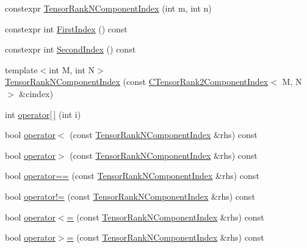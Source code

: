 \begin{DoxyCompactItemize}
\item 
constexpr \mbox{\hyperlink{classmpc_1_1core_1_1_tensor_rank_n_component_index_3_012_01_4_aea9ecace40b5b929c8aea1eadcbf61a4}{Tensor\+Rank\+N\+Component\+Index}} (int m, int n)
\item 
constexpr int \mbox{\hyperlink{classmpc_1_1core_1_1_tensor_rank_n_component_index_3_012_01_4_afe7292937d5a92d4f5fb95f71eed9187}{First\+Index}} () const
\item 
constexpr int \mbox{\hyperlink{classmpc_1_1core_1_1_tensor_rank_n_component_index_3_012_01_4_a592f40b07ac41675f94cbd986de89914}{Second\+Index}} () const
\item 
{\footnotesize template$<$int M, int N$>$ }\\\mbox{\hyperlink{classmpc_1_1core_1_1_tensor_rank_n_component_index_3_012_01_4_ab5582e74c69cfe2c25915fba547613c8}{Tensor\+Rank\+N\+Component\+Index}} (const \mbox{\hyperlink{classmpc_1_1core_1_1_c_tensor_rank2_component_index}{C\+Tensor\+Rank2\+Component\+Index}}$<$ M, N $>$ \&cindex)
\item 
int \mbox{\hyperlink{classmpc_1_1core_1_1_tensor_rank_n_component_index_3_012_01_4_a760e713bc39d78243bb8979aabe0c245}{operator\mbox{[}$\,$\mbox{]}}} (int i)
\item 
bool \mbox{\hyperlink{classmpc_1_1core_1_1_tensor_rank_n_component_index_3_012_01_4_affa9968262b55f95c8008607b279935a}{operator$<$}} (const \mbox{\hyperlink{classmpc_1_1core_1_1_tensor_rank_n_component_index}{Tensor\+Rank\+N\+Component\+Index}} \&rhs) const
\item 
bool \mbox{\hyperlink{classmpc_1_1core_1_1_tensor_rank_n_component_index_3_012_01_4_a7fd0591ac06ae0ffc5b9fe7050bfe8f0}{operator$>$}} (const \mbox{\hyperlink{classmpc_1_1core_1_1_tensor_rank_n_component_index}{Tensor\+Rank\+N\+Component\+Index}} \&rhs) const
\item 
bool \mbox{\hyperlink{classmpc_1_1core_1_1_tensor_rank_n_component_index_3_012_01_4_a1c3cdc913993da73dd1dae587ef7ebbc}{operator==}} (const \mbox{\hyperlink{classmpc_1_1core_1_1_tensor_rank_n_component_index}{Tensor\+Rank\+N\+Component\+Index}} \&rhs) const
\item 
bool \mbox{\hyperlink{classmpc_1_1core_1_1_tensor_rank_n_component_index_3_012_01_4_a966dfbb52b3436ba0c2b7e77e8b0114f}{operator!=}} (const \mbox{\hyperlink{classmpc_1_1core_1_1_tensor_rank_n_component_index}{Tensor\+Rank\+N\+Component\+Index}} \&rhs) const
\item 
bool \mbox{\hyperlink{classmpc_1_1core_1_1_tensor_rank_n_component_index_3_012_01_4_a791506c8e8a0b12384b476e3ee383e4c}{operator$<$=}} (const \mbox{\hyperlink{classmpc_1_1core_1_1_tensor_rank_n_component_index}{Tensor\+Rank\+N\+Component\+Index}} \&rhs) const
\item 
bool \mbox{\hyperlink{classmpc_1_1core_1_1_tensor_rank_n_component_index_3_012_01_4_ac33102ffc7a99fdc67888c9279b294e6}{operator$>$=}} (const \mbox{\hyperlink{classmpc_1_1core_1_1_tensor_rank_n_component_index}{Tensor\+Rank\+N\+Component\+Index}} \&rhs) const
\end{DoxyCompactItemize}
